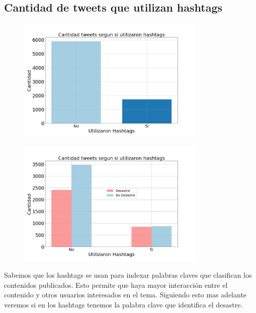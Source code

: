\documentclass[titlepage,a4paper]{article}
\begin{document}
\subsection{\Large Cantidad de tweets que utilizan hashtags}
{\Large
\begin{figure}[H]
 \centering
 \includegraphics[width=0.8\textwidth, height=0.8\textheight, keepaspectratio]{graficos/cantidad_tweets_utilizaron_hashtags_0.png}
\end{figure}
\begin{figure}[H]
 \centering
 \includegraphics[width=0.8\textwidth, height=0.8\textheight, keepaspectratio]{graficos/cantidad_tweets_utilizaron_hashtags_1.png}
\end{figure}
Sabemos que los hashtags se usan para indexar palabras claves que clasifican los contenidos publicados. Esto permite que haya mayor interacción  entre el contenido y otros usuarios interesados en el tema. Siguiendo esto mas adelante veremos si en los hashtags tenemos la palabra clave que identifica el desastre.
\par}
\end{document}
